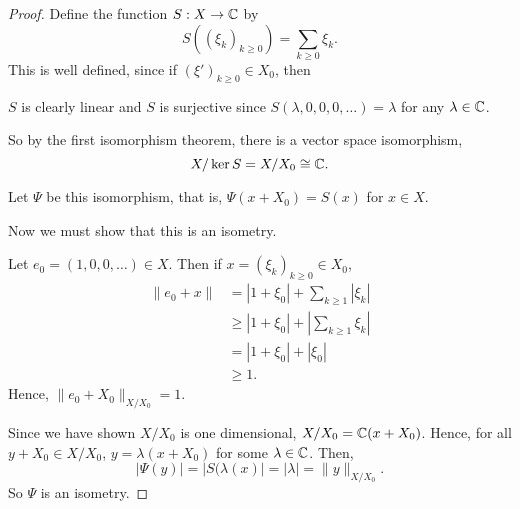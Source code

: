 \documentclass{unswmaths}
\begin{document}
\begin{proof}
    Define the function $S:X\rightarrow \mathbb{C}$ by
    \begin{equation*}
        S((\xi_k)_{k\geq 0}) = \sum_{k\geq 0} \xi_k.
    \end{equation*}
    This is well defined, since if $(\xi')_{k\geq 0} \in X_0$, then 
%    


    $S$ is clearly linear and $S$ is surjective since $S(\lambda,0,0,0,\ldots) = \lambda$ for any $\lambda \in \mathbb{C}$.
    
    So by the first isomorphism theorem, there is a vector space isomorphism,
    \begin{equation*}
        X/\ker S = X/X_0 \cong \mathbb{C}.
    \end{equation*}
    
    Let $\Psi$ be this isomorphism, that is,
    $\Psi(x+X_0) = S(x)$ for $x \in X$.
    
    Now we must show that this is an isometry.
    
    Let $e_0 = (1,0,0,\ldots) \in X$. Then if $x = (\xi_k)_{k\geq 0} \in X_0$, 
    \begin{align*}
        \|e_0+x\| &= |1+\xi_0| + \sum_{k\geq 1} |\xi_k|\\
        &\geq |1+\xi_0|+|\sum_{k\geq 1} \xi_k|\\
        &= |1+\xi_0|+|\xi_0|\\
        &\geq 1.
    \end{align*}
    Hence, $\|e_0+X_0\|_{X/X_0} = 1$. 
    
%    
    
    
    Since we have shown $X/X_0$ is one dimensional, $X/X_0 = \mathbb{C}(x+X_0)$. Hence, for 
    all $y + X_0 \in X/X_0$, $y = \lambda(x+X_0)$ for some $\lambda \in \mathbb{C}$. Then,
    \begin{equation*}
        |\Psi(y)| = |S(\lambda(x)| = |\lambda| = \|y\|_{X/X_0}.
    \end{equation*}
    So $\Psi$ is an isometry.
\end{proof}
\end{document}
